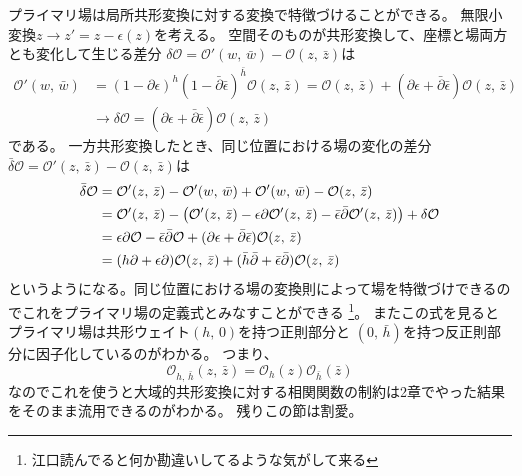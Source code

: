 \documentclass[../../master.tex]{subfiles}
\begin{document}
プライマリ場は局所共形変換に対する変換で特徴づけることができる。
無限小変換\(z\rightarrow z' = z - \epsilon(z)\)を考える。
空間そのものが共形変換して、座標と場両方とも変化して生じる差分
\(\delta\mathcal{O}=\mathcal{O}'(w,\,\bar{w})-\mathcal{O}(z,\,\bar{z})\)は
\begin{align*}
    \mathcal{O}'(w,\,\bar{w})
    &= (1-\partial\epsilon)^h(1-\bar{\partial}\bar{\epsilon})^{\bar{h}}\mathcal{O}(z,\,\bar{z})
    = \mathcal{O}(z,\,\bar{z}) +(\partial\epsilon+\bar{\partial}\bar{\epsilon})\mathcal{O}(z,\,\bar{z})\\
    &\rightarrow \delta \mathcal{O} = (\partial\epsilon+\bar{\partial}\bar{\epsilon})\mathcal{O}(z,\,\bar{z})
\end{align*}
である。
一方共形変換したとき、同じ位置における場の変化の差分
\(\bar{\delta}\mathcal{O}=\mathcal{O}'(z,\,\bar{z})-\mathcal{O}(z,\,\bar{z})\)は
\begin{align}
    \bar{\delta}\mathcal{O}
    &= \mathcal{O}'(z,\,\bar{z})-\mathcal{O}'(w,\,\bar{w}) + \mathcal{O}'(w,\,\bar{w}) -\mathcal{O}(z,\,\bar{z})\notag\\
    &= \mathcal{O}'(z,\,\bar{z}) -\qty(
        \mathcal{O}'(z,\,\bar{z}) - \epsilon\partial\mathcal{O}'(z,\,\bar{z})-\bar{\epsilon}\bar{\partial}\mathcal{O}'(z,\,\bar{z}))
        +\delta\mathcal{O}\notag\\
    &= \epsilon\partial\mathcal{O}-\bar{\epsilon}\bar{\partial}\mathcal{O}
    + (\partial\epsilon+\bar{\partial}\bar{\epsilon})\mathcal{O}(z,\,\bar{z})\notag\\
    &= (h\partial+\epsilon \partial)\mathcal{O}(z,\,\bar{z}) +(\bar{h}\bar{\partial}+\bar{\epsilon} \bar{\partial})\mathcal{O}(z,\,\bar{z})
\end{align}
というようになる。同じ位置における場の変換則によって場を特徴づけできるのでこれをプライマリ場の定義式とみなすことができる
\footnote{江口読んでると何か勘違いしてるような気がして来る}。
またこの式を見るとプライマリ場は共形ウェイト\((h,\,0)\)を持つ正則部分と
\((0,\,\bar{h})\)を持つ反正則部分に因子化しているのがわかる。
つまり、
\begin{equation*}
    \mathcal{O}_{h,\,\bar{h}}(z,\,\bar{z}) = \mathcal{O}_{h}(z)\mathcal{O}_{\bar{h}}(\bar{z})
\end{equation*}
なのでこれを使うと大域的共形変換に対する相関関数の制約は2章でやった結果をそのまま流用できるのがわかる。
残りこの節は割愛。
\setcounter{equation}{40}
\end{document}
